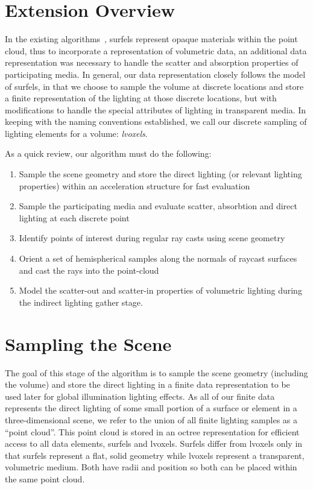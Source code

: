 \documentclass[12pt]{ucthesis}
\begin{document}
\section{Extension Overview}

In the existing algorithms~\cite{christensen:2008}, surfels represent opaque materials within the point cloud, thus to incorporate a representation of volumetric data, an additional data representation was necessary to handle the scatter and absorption properties of participating media.  In general, our data representation closely follows the model of surfels, in that we choose to sample the volume at discrete locations and store a finite representation of the lighting at those discrete locations, but with modifications to handle the special attributes of lighting in transparent media.  In keeping with the naming conventions established, we call our discrete sampling of lighting elements for a volume: \emph{lvoxels}.  

As a quick review, our algorithm must do the following:
\begin{enumerate}
\item Sample the scene geometry and store the direct lighting (or relevant lighting properties) within an acceleration structure for fast evaluation
\item Sample the participating media and evaluate scatter, absorbtion and direct lighting at each discrete point
\item Identify points of interest during regular ray casts using scene geometry 
\item Orient a set of hemispherical samples along the normals of raycast surfaces and cast the rays into the point-cloud
\item Model the scatter-out and scatter-in properties of volumetric lighting during the indirect lighting gather stage.
\end{enumerate}

\section{Sampling the Scene}
The goal of this stage of the algorithm is to sample the scene geometry (including the volume) and store the direct lighting in a finite data representation to be used later for global illumination lighting effects.  As all of our finite data represents the direct lighting of some small portion of a surface or element in a three-dimensional scene, we refer to the union of all finite lighting samples as a ``point cloud''.  This point cloud is stored in an octree representation for efficient access to all data elements, surfels and lvoxels.  Surfels differ from lvoxels only in that surfels represent a flat, solid geometry while lvoxels represent a transparent, volumetric medium.  Both have radii and position so both can be placed within the same point cloud.  
\end{document}

